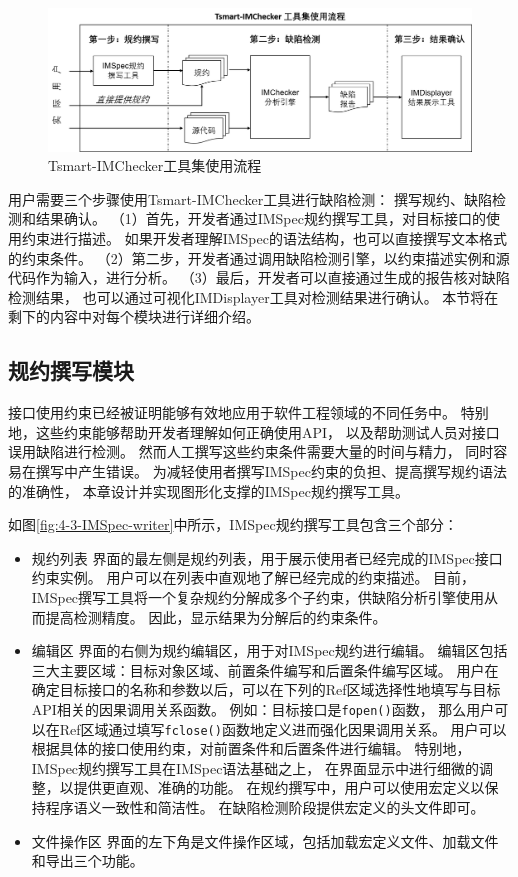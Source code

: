 \begin{figure}[t]
	\centering
	\includegraphics[width=\linewidth]{figures/cp4-overview.png}
	\caption{
		Tsmart-IMChecker工具集使用流程
	}
	\label{fig:4-3-overview}
\end{figure}

用户需要三个步骤使用Tsmart-IMChecker工具进行缺陷检测：
撰写规约、缺陷检测和结果确认。
（1）首先，开发者通过IMSpec规约撰写工具，对目标接口的使用约束进行描述。
如果开发者理解IMSpec的语法结构，也可以直接撰写文本格式的约束条件。
（2）第二步，开发者通过调用缺陷检测引擎，以约束描述实例和源代码作为输入，进行分析。
（3）最后，开发者可以直接通过生成的报告核对缺陷检测结果，
也可以通过可视化IMDisplayer工具对检测结果进行确认。
本节将在剩下的内容中对每个模块进行详细介绍。


\subsection{规约撰写模块}
接口使用约束已经被证明能够有效地应用于软件工程领域的不同任务中。
特别地，这些约束能够帮助开发者理解如何正确使用API，
以及帮助测试人员对接口误用缺陷进行检测。
然而人工撰写这些约束条件需要大量的时间与精力，
同时容易在撰写中产生错误。
为减轻使用者撰写IMSpec约束的负担、提高撰写规约语法的准确性，
本章设计并实现图形化支撑的IMSpec规约撰写工具。

如图\ref{fig:4-3-IMSpec-writer}中所示，IMSpec规约撰写工具包含三个部分：
\begin{itemize}
	\item {\kaishu 规约列表}
	界面的最左侧是规约列表，用于展示使用者已经完成的IMSpec接口约束实例。
	用户可以在列表中直观地了解已经完成的约束描述。
	目前，IMSpec撰写工具将一个复杂规约分解成多个子约束，供缺陷分析引擎使用从而提高检测精度。
	因此，显示结果为分解后的约束条件。
	\item {\kaishu 编辑区} 
	界面的右侧为规约编辑区，用于对IMSpec规约进行编辑。
	编辑区包括三大主要区域：目标对象区域、前置条件编写和后置条件编写区域。
	用户在确定目标接口的名称和参数以后，可以在下列的Ref区域选择性地填写与目标API相关的因果调用关系函数。
	例如：目标接口是\texttt{fopen()}函数，
	那么用户可以在Ref区域通过填写\texttt{fclose()}函数地定义进而强化因果调用关系。
	用户可以根据具体的接口使用约束，对前置条件和后置条件进行编辑。
	特别地，IMSpec规约撰写工具在IMSpec语法基础之上，
	在界面显示中进行细微的调整，以提供更直观、准确的功能。
	在规约撰写中，用户可以使用宏定义以保持程序语义一致性和简洁性。
	在缺陷检测阶段提供宏定义的头文件即可。
	\item {\kaishu 文件操作区} 
	界面的左下角是文件操作区域，包括加载宏定义文件、加载文件和导出三个功能。
	
\end{itemize}


